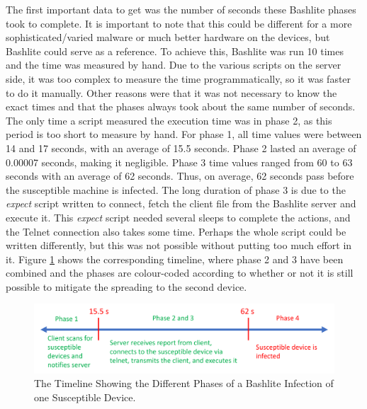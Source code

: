 The first important data to get was the number of seconds these Bashlite phases took to complete. It is important to note that this could be different for a more sophisticated/varied malware or much better hardware on the devices, but Bashlite could serve as a reference. To achieve this, Bashlite was run 10 times and the time was measured by hand. Due to the various scripts on the server side, it was too complex to measure the time programmatically, so it was faster to do it manually. Other reasons were that it was not necessary to know the exact times and that the phases always took about the same number of seconds. The only time a script measured the execution time was in phase 2, as this period is too short to measure by hand. For phase 1, all time values were between 14 and 17 seconds, with an average of 15.5 seconds. Phase 2 lasted an average of 0.00007 seconds, making it negligible. Phase 3 time values ranged from 60 to 63 seconds with an average of 62 seconds. Thus, on average, 62 seconds pass before the susceptible machine is infected. The long duration of phase 3 is due to the \textit{expect} script written to connect, fetch the client file from the Bashlite server and execute it. This \textit{expect} script needed several sleeps to complete the actions, and the Telnet connection also takes some time. Perhaps the whole script could be written differently, but this was not possible without putting too much effort in it. 
Figure \ref{graphic:timelinePhases} shows the corresponding timeline, where phase 2 and 3 have been combined and the phases are colour-coded according to whether or not it is still possible to mitigate the spreading to the second device. 


\begin{figure}[tph]
\includegraphics[scale=0.7]{assets/timelinePhases.png}
\centering
\caption{The Timeline Showing the Different Phases of a Bashlite Infection of one Susceptible Device.}
    \label{graphic:timelinePhases}
\end{figure}



